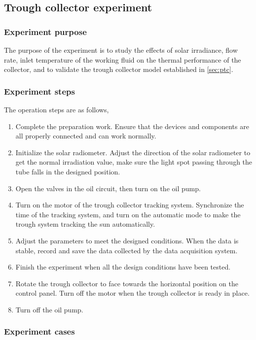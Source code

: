 \subsection{Trough collector experiment}
\subsubsection{Experiment purpose}
The purpose of the experiment is to study the effects of solar irradiance, flow rate, inlet temperature of the working fluid on the thermal performance of the collector, and to validate the trough collector model established in \autoref{sec:ptc}. 
\subsubsection{Experiment steps}
The operation steps are as follows,
\begin{enumerate}[label=(\arabic*)]
	\item Complete the preparation work. Ensure that the devices and components are all properly connected and can work normally.
	\item Initialize the solar radiometer. Adjust the direction of the solar radiometer to get the normal irradiation value, make sure the light spot passing through the tube falls in the designed position.
	\item Open the valves in the oil circuit, then turn on the oil pump.
	\item Turn on the motor of the trough collector tracking system. Synchronize the time of the tracking system, and turn on the automatic mode to make the trough system tracking the sun automatically.
	\item Adjust the parameters to meet the designed conditions. When the data is stable, record and save the data collected by the data acquisition system.
	\item Finish the experiment when all the design conditions have been tested.
	\item Rotate the trough collector to face towards the horizontal position on the control panel. Turn off the motor when the trough collector is ready in place.
	\item Turn off the oil pump.
\end{enumerate}

\subsubsection{Experiment cases}


